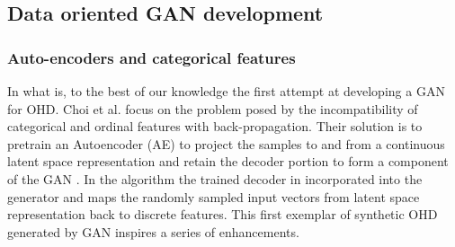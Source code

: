 \subsection{Data oriented GAN development}
\subsubsection{Auto-encoders and categorical features}
In what is, to the best of our knowledge the first attempt at developing a GAN for OHD. Choi et al. focus on the problem posed by the incompatibility of categorical and ordinal features with back-propagation. Their solution is to pretrain an Autoencoder (AE) to project the samples to and from a continuous latent space representation and retain the decoder portion to form a component of the GAN \cite{Choi2017-nt}. In the algorithm  the trained decoder in incorporated into the generator and maps the randomly sampled input vectors from latent space representation back to discrete features. This first exemplar of synthetic OHD generated by GAN inspires a series of enhancements.\par

